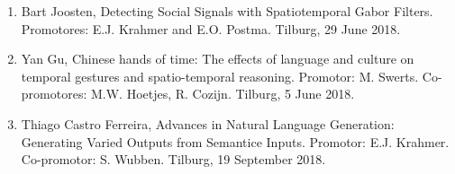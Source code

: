 \begin{enumerate}
\item{Bart Joosten, Detecting Social Signals with Spatiotemporal Gabor Filters. Promotores: E.J. Krahmer and E.O. Postma. Tilburg, 29 June 2018.}
\item{Yan Gu, Chinese hands of time: The effects of language and culture on temporal gestures and spatio-temporal reasoning. Promotor: M. Swerts. Co-promotores: M.W. Hoetjes, R. Cozijn. Tilburg, 5 June 2018.
}
\item{Thiago Castro Ferreira, Advances in Natural Language Generation: Generating Varied Outputs from Semantice Inputs. Promotor: E.J. Krahmer. Co-promotor: S. Wubben. 
Tilburg, 19 September 2018.}
\end{enumerate}